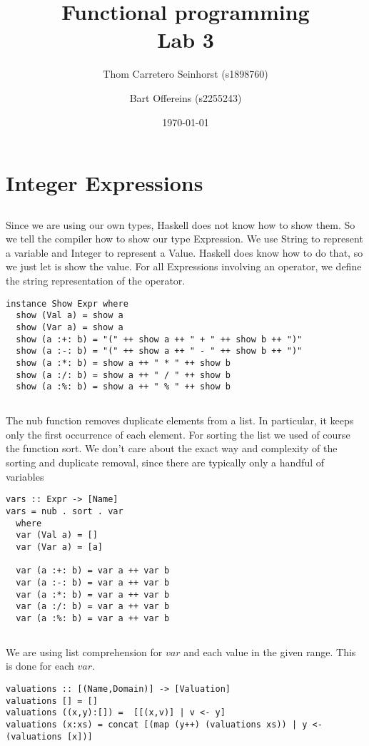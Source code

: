 \documentclass[a4paper,11pt]{article}
\author{Thom Carretero Seinhorst (s1898760) \and Bart Offereins (s2255243)}
\date{\today}
\title{Functional programming \\Lab 3}
\begin{document}
  \maketitle

\section{Integer Expressions}

\subsection{}
Since we are using our own types, Haskell does not know how to show them. So we tell the compiler how to show our type Expression. We use String to represent a variable and Integer to represent a Value. Haskell does know how to do that, so we just let is show the value. For all Expressions involving an operator, we define the string representation of the operator.
\begin{lstlisting}
instance Show Expr where
  show (Val a) = show a
  show (Var a) = show a
  show (a :+: b) = "(" ++ show a ++ " + " ++ show b ++ ")"
  show (a :-: b) = "(" ++ show a ++ " - " ++ show b ++ ")"
  show (a :*: b) = show a ++ " * " ++ show b
  show (a :/: b) = show a ++ " / " ++ show b
  show (a :%: b) = show a ++ " % " ++ show b
\end{lstlisting}

\subsection{}
The nub function removes duplicate elements from a list. In particular, it keeps only the first occurrence of each element. For sorting the list we used of course the function sort. We don't care about the exact way and complexity of the sorting and duplicate removal, since there are typically only a handful of variables

\begin{lstlisting}
vars :: Expr -> [Name]
vars = nub . sort . var
  where
  var (Val a) = []
  var (Var a) = [a]

  var (a :+: b) = var a ++ var b
  var (a :-: b) = var a ++ var b
  var (a :*: b) = var a ++ var b
  var (a :/: b) = var a ++ var b
  var (a :%: b) = var a ++ var b
\end{lstlisting}

\subsection{}
We are using list comprehension for $var$ and each value in the given range. This is done for each $var$.
\begin{lstlisting}
valuations :: [(Name,Domain)] -> [Valuation]
valuations [] = []
valuations ((x,y):[]) =  [[(x,v)] | v <- y]
valuations (x:xs) = concat [(map (y++) (valuations xs)) | y <- (valuations [x])]
\end{lstlisting}
\end{document}
